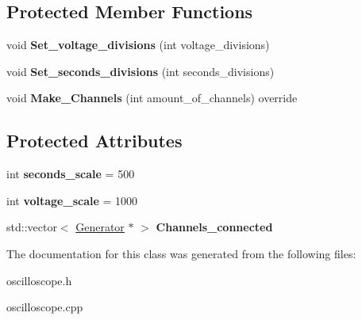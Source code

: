 \subsection*{Protected Member Functions}
\begin{DoxyCompactItemize}
\item 
\mbox{\label{class_oscilloscope_aa88a1feaa573264131b1fcea159bc494}} 
void {\bfseries Set\+\_\+voltage\+\_\+divisions} (int voltage\+\_\+divisions)
\item 
\mbox{\label{class_oscilloscope_a1f0bb8a08faadb4cb91f149cd43ec4ee}} 
void {\bfseries Set\+\_\+seconds\+\_\+divisions} (int seconds\+\_\+divisions)
\item 
\mbox{\label{class_oscilloscope_a78adf35e309569effe02be4f612274cc}} 
void {\bfseries Make\+\_\+\+Channels} (int amount\+\_\+of\+\_\+channels) override
\end{DoxyCompactItemize}
\subsection*{Protected Attributes}
\begin{DoxyCompactItemize}
\item 
\mbox{\label{class_oscilloscope_a79018d944ddd1175241202a549ed9f31}} 
int {\bfseries seconds\+\_\+scale} = 500
\item 
\mbox{\label{class_oscilloscope_a94b692c486de0e6b99bc0c07998cff27}} 
int {\bfseries voltage\+\_\+scale} = 1000
\item 
\mbox{\label{class_oscilloscope_ab2eb633941275983f6964dca267a8b4f}} 
std\+::vector$<$ \mbox{\hyperlink{class_generator}{Generator}} $\ast$ $>$ {\bfseries Channels\+\_\+connected}
\end{DoxyCompactItemize}


The documentation for this class was generated from the following files\+:\begin{DoxyCompactItemize}
\item 
oscilloscope.\+h\item 
oscilloscope.\+cpp\end{DoxyCompactItemize}
